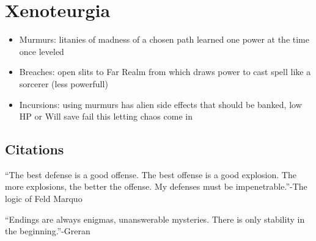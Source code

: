\documentclass[10pt,a4paper]{article}
\begin{document}
\section{Xenoteurgia}
\begin{itemize}
\item Murmurs: litanies of madness of a chosen path learned one power at the time once leveled
\item Breaches: open slits to Far Realm from which draws power to cast spell like a sorcerer (less powerfull)
\item Incursions: using murmurs has alien side effects that should be banked, low HP or Will save fail this letting chaos come in
\end{itemize}


\subsection{Citations}
``The best defense is a good offense. The best offense is a good explosion. The more explosions, the better the offense. My defenses must be impenetrable.''-The logic of Feld Marquo

``Endings are always enigmas, unanswerable mysteries. There is only stability in the beginning.''-Greran
\end{document}
